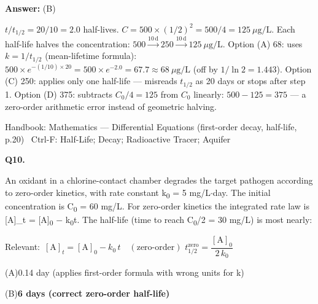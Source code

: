 \documentclass[11pt]{article}
\newcommand{\correct}[1]{\textbf{#1}\;{\color{accent}$\checkmark$}}
\newcommand{\optline}[2]{\par\noindent\hspace{1.2em}(#1)\hspace{0.6em}#2}
\begin{document}
\par\vspace{3pt}
\vspace{2pt}\par\noindent\colorbox{boxbg}{\parbox{\dimexpr\linewidth-2\fboxsep\relax}{%
\vspace{2pt}\textbf{Answer:} (B)\par\vspace{2pt}
{\small $t/t_{1/2} = 20/10 = 2.0$ half-lives. $C = 500\times(1/2)^2 = 500/4 = 125\ \mu\mathrm{g/L}$. Each half-life halves the concentration: $500 \xrightarrow{10\,\mathrm{d}} 250 \xrightarrow{10\,\mathrm{d}} 125\ \mu\mathrm{g/L}$. Option (A) 68: uses $k = 1/t_{1/2}$ (mean-lifetime formula): $500\times e^{-(1/10)\times20} = 500\times e^{-2.0} = 67.7\approx68\ \mu\mathrm{g/L}$ (off by $1/\ln 2 = 1.443$). Option (C) 250: applies only one half-life --- misreads $t_{1/2}$ as 20 days or stops after step 1. Option (D) 375: subtracts $C_0/4 = 125$ from $C_0$ linearly: $500-125 = 375$ --- a zero-order arithmetic error instead of geometric halving.}\par\vspace{2pt}
{\footnotesize\color{soft}Handbook: Mathematics --- Differential Equations (first-order decay, half-life, p.20) \textbullet\ Ctrl-F: Half-Life; Decay; Radioactive Tracer; Aquifer}\vspace{2pt}
}}
\vspace{9pt}
\filbreak
\textbf{\color{accent}Q10.}\par\vspace{2pt}
An oxidant in a chlorine-contact chamber degrades the target pathogen according to zero-order kinetics, with rate constant k\textsubscript{0} = 5 mg/L$\cdot$day. The initial concentration is C\textsubscript{0} = 60 mg/L. For zero-order kinetics the integrated rate law is [A]\_t = [A]\textsubscript{0} $-$ k\textsubscript{0}t. The half-life (time to reach C\textsubscript{0}/2 = 30 mg/L) is most nearly:\par\vspace{3pt}
{\small\color{soft}Relevant:}\ $[\mathrm{A}]_t = [\mathrm{A}]_0 - k_0\,t\quad(\text{zero-order})$ \quad $t_{1/2}^{\text{zero}} = \dfrac{[\mathrm{A}]_0}{2\,k_0}$\par\vspace{3pt}
\optline{A}{0.14 day  (applies first-order formula with wrong units for k)}
\optline{B}{\correct{6 days  (correct zero-order half-life)}}
\end{document}
